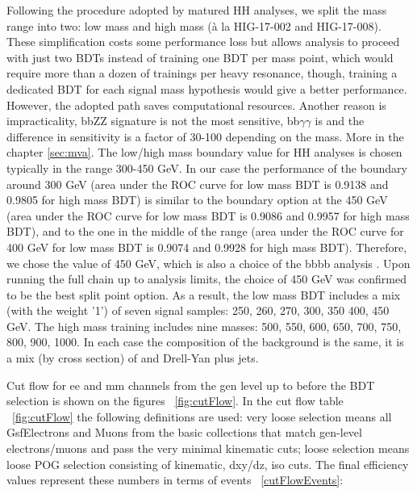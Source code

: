 Following the procedure adopted by matured HH analyses, we
split the mass range into two: low mass and high mass (\`a la HIG-17-002 and HIG-17-008). These simplification costs some performance loss but allows analysis to proceed with just two BDTs instead of training one BDT per mass point, which would require more than a dozen of trainings per heavy resonance, though, training a dedicated BDT for each
signal mass hypothesis would give a better performance. However, the adopted path saves computational resources. Another reason is impracticality, bbZZ
signature is not the most sensitive, bb$\gamma$$\gamma$ is and the difference in sensitivity is a factor of 30-100 depending on the mass. More in the chapter \ref{sec:mva}.
The low/high mass boundary value for HH analyses is chosen typically in the range 300-450
GeV. In our case the performance of the boundary around 300 GeV (area under the ROC curve
for low mass BDT is 0.9138 and 0.9805 for high mass BDT) is
similar to the boundary option at the 450 GeV (area under the ROC curve
for low mass BDT is 0.9086 and 0.9957 for high mass BDT), and to the one in the
middle of the range (area under the ROC curve
for 400 GeV for low mass BDT is 0.9074 and 0.9928 for high mass BDT). 
Therefore, we chose the value of 450 GeV, which
is also a choice of the bbbb analysis \cite{bbbb}. Upon running the full chain up to analysis limits, the choice of 450 GeV was confirmed to be the best split point option. As a result, the low
mass BDT includes a mix (with the weight '1') of seven signal samples:
250, 260, 270, 300, 350 400, 450 GeV. The high mass training includes nine
masses: 500, 550, 600, 650, 700, 750, 800, 900, 1000. In each case the
composition of the background is the same, it is a mix (by cross
section) of \ttbar and Drell-Yan plus jets.


Cut flow for ee and mm channels from the gen level up to before the BDT selection is shown on the figures ~\ref{fig:cutFlow}. In the cut flow table ~\ref{fig:cutFlow} the following definitions are used: very loose selection means all GsfElectrons and Muons from the basic collections that match gen-level electrons/muons and pass the very minimal kinematic cuts; loose selection means loose POG selection consisting of kinematic, dxy/dz, iso cuts. The final efficiency values represent these numbers in terms of events ~\ref{cutFlowEvents}:

